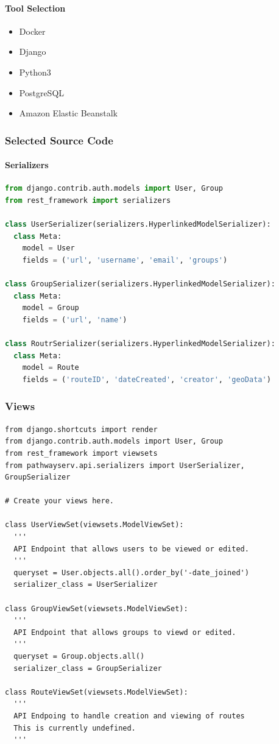 \documentclass{article}
\begin{document}
\paragraph{Tool Selection}
\begin{itemize}
    \item Docker
    \item Django
    \item Python3
    \item PostgreSQL
    \item Amazon Elastic Beanstalk
\end{itemize}

\subsubsection{Selected Source Code}
\paragraph{Serializers}
\begin{lstlisting}[language=Python]
from django.contrib.auth.models import User, Group
from rest_framework import serializers

class UserSerializer(serializers.HyperlinkedModelSerializer):
  class Meta:
    model = User
    fields = ('url', 'username', 'email', 'groups')

class GroupSerializer(serializers.HyperlinkedModelSerializer):
  class Meta:
    model = Group
    fields = ('url', 'name')

class RoutrSerializer(serializers.HyperlinkedModelSerializer):
  class Meta:
    model = Route
    fields = ('routeID', 'dateCreated', 'creator', 'geoData')
\end{lstlisting}

\subsubsection{Views}
\begin{lstlisting}[langauge=Python]
from django.shortcuts import render
from django.contrib.auth.models import User, Group
from rest_framework import viewsets
from pathwayserv.api.serializers import UserSerializer, GroupSerializer

# Create your views here.

class UserViewSet(viewsets.ModelViewSet):
  '''
  API Endpoint that allows users to be viewed or edited.
  '''
  queryset = User.objects.all().order_by('-date_joined')
  serializer_class = UserSerializer

class GroupViewSet(viewsets.ModelViewSet):
  '''
  API Endpoint that allows groups to viewd or edited.
  '''
  queryset = Group.objects.all()
  serializer_class = GroupSerializer

class RouteViewSet(viewsets.ModelViewSet):
  '''
  API Endpoing to handle creation and viewing of routes
  This is currently undefined.
  '''
\end{lstlisting}
\end{document}

